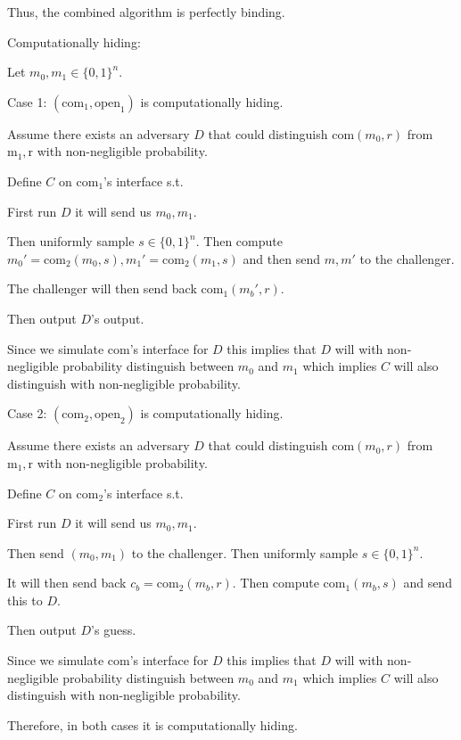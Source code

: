 \documentclass[12pt, letterpaper]{article}
\newcommand{\bit}{{\{0,1\}}}
\newcommand{\com}{\mathrm{com}}
\begin{document}
\begin{problemproof}
    Thus, the combined algorithm is perfectly binding.

    Computationally hiding:

    Let $m_0,m_1 \in \bit^n$. 

    Case 1: $(\mathrm{com}_1,\mathrm{open}_1)$ is computationally hiding.

    Assume there exists an adversary $D$ that could distinguish $\mathrm{com}(m_0,r)$ from $\mathrm{m_1,r}$ with non-negligible probability.

    Define $C$ on $\mathrm{com}_1$'s interface s.t.

    First run $D$ it will send us $m_0,m_1$.

    Then uniformly sample $s \in \bit^n$. Then compute $m_0'=\com_2(m_0,s), m_1'=\com_2(m_1,s)$ and then send $m,m'$ to the challenger.

    The challenger will then send back $\com_1(m_b',r)$.

    Then output $D$'s output.

    Since we simulate $\com$'s interface for $D$ this implies that $D$ will with non-negligible probability distinguish between $m_0$ and $m_1$ which implies $C$ will also distinguish with non-negligible probability.
    
    Case 2: $(\mathrm{com}_2,\mathrm{open}_2)$ is computationally hiding.

    Assume there exists an adversary $D$ that could distinguish $\mathrm{com}(m_0,r)$ from $\mathrm{m_1,r}$ with non-negligible probability.

    Define $C$ on $\mathrm{com}_2$'s interface s.t. 
    
    First run $D$ it will send us $m_0,m_1$.

    Then send $(m_0, m_1)$ to the challenger. Then uniformly sample $s \in \bit^n$.

    It will then send back $c_b = \mathrm{com}_2(m_b,r)$. Then compute $\com_1(m_b,s)$ and send this to $D$.

    Then output $D$'s guess.

    Since we simulate $\com$'s interface for $D$ this implies that $D$ will with non-negligible probability distinguish between $m_0$ and $m_1$ which implies $C$ will also distinguish with non-negligible probability.

    Therefore, in both cases it is computationally hiding.
\end{problemproof}
\end{document}
